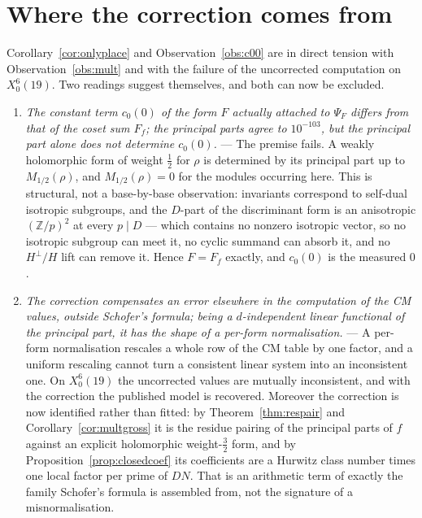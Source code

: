 \documentclass[11pt,reqno]{amsart}
\theoremstyle{plain}
\theoremstyle{definition}
\newcommand{\Z}{\mathbb{Z}}
\begin{document}
\section{Where the correction comes from}\label{sec:open}

Corollary~\ref{cor:onlyplace} and Observation~\ref{obs:c00} are in direct tension with
Observation~\ref{obs:mult} and with the failure of the uncorrected computation on $X_0^{6}(19)$.
Two readings suggest themselves, and both can now be excluded.

\begin{enumerate}
\item \emph{The constant term $c_0(0)$ of the form $F$ actually attached to $\Psi_F$ differs from
      that of the coset sum $F_f$; the principal parts agree to $10^{-103}$, but the principal part
      alone does not determine $c_0(0)$.} --- The premise fails. A weakly holomorphic form of
      weight $\tfrac12$ for $\rho$ is determined by its principal part up to
      $M_{1/2}(\rho)$, and $M_{1/2}(\rho)=0$ for the modules occurring here. This is structural,
      not a base-by-base observation: invariants correspond to self-dual isotropic subgroups, and
      the $D$-part of the discriminant form is an anisotropic $(\Z/p)^2$ at every $p\mid D$ ---
      which contains no nonzero isotropic vector, so no isotropic subgroup can meet it, no cyclic
      summand can absorb it, and no $H^\perp/H$ lift can remove it. Hence $F=F_f$ exactly, and
      $c_0(0)$ is the measured $0$.
\item \emph{The correction compensates an error elsewhere in the computation of the CM values,
      outside Schofer's formula; being a $d$-independent linear functional of the principal part,
      it has the shape of a per-form normalisation.} --- A per-form normalisation rescales a whole
      row of the CM table by one factor, and a uniform rescaling cannot turn a consistent linear
      system into an inconsistent one. On $X_0^{6}(19)$ the uncorrected values are mutually
      inconsistent, and with the correction the published model is recovered. Moreover the
      correction is now identified rather than fitted: by
      Theorem~\ref{thm:respair} and Corollary~\ref{cor:multgross} it is the residue pairing of the
      principal parts of $f$ against an explicit holomorphic weight-$\tfrac32$ form, and by
      Proposition~\ref{prop:closedcoef} its coefficients are a Hurwitz class number times one local
      factor per prime of $DN$. That is an arithmetic term of exactly the family Schofer's formula
      is assembled from, not the signature of a misnormalisation.
\end{enumerate}
\end{document}
